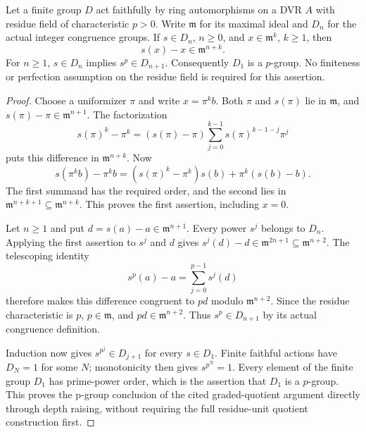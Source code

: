 \begin{lemma}
\label{fw:wild-ramification-p-group}
\leanok
Let a finite group $D$ act faithfully by ring automorphisms on a
DVR $A$ with residue field of characteristic $p>0$. Write
$\mathfrak m$ for its maximal ideal and $D_n$ for the actual
integer congruence groups. If $s\in D_n$, $n\geq0$, and
$x\in\mathfrak m^k$, $k\geq1$, then
\[
 s(x)-x\in\mathfrak m^{n+k}.
\]
For $n\geq1$, $s\in D_n$ implies $s^p\in D_{n+1}$.
Consequently $D_1$ is a $p$-group. No finiteness or perfection
assumption on the residue field is required for this assertion.
\end{lemma}
\begin{proof}
Choose a uniformizer $\pi$ and write $x=\pi^k b$.
Both $\pi$ and $s(\pi)$ lie in $\mathfrak m$, and
$s(\pi)-\pi\in\mathfrak m^{n+1}$. The factorization
\[
 s(\pi)^k-\pi^k=(s(\pi)-\pi)
   \sum_{j=0}^{k-1}s(\pi)^{k-1-j}\pi^j
\]
puts this difference in $\mathfrak m^{n+k}$.
Now
\[
 s(\pi^k b)-\pi^k b=
   (s(\pi)^k-\pi^k)s(b)+\pi^k(s(b)-b).
\]
The first summand has the required order, and the second lies
in $\mathfrak m^{n+k+1}\subseteq\mathfrak m^{n+k}$.
This proves the first assertion, including $x=0$.

Let $n\geq1$ and put $d=s(a)-a\in\mathfrak m^{n+1}$.
Every power $s^j$ belongs to $D_n$. Applying the first assertion
to $s^j$ and $d$ gives
$s^j(d)-d\in\mathfrak m^{2n+1}\subseteq\mathfrak m^{n+2}$.
The telescoping identity
\[
 s^p(a)-a=\sum_{j=0}^{p-1}s^j(d)
\]
therefore makes this difference congruent to $pd$ modulo
$\mathfrak m^{n+2}$. Since the residue characteristic is $p$,
$p\in\mathfrak m$, and $pd\in\mathfrak m^{n+2}$.
Thus $s^p\in D_{n+1}$ by its actual congruence definition.

Induction now gives $s^{p^j}\in D_{j+1}$ for every $s\in D_1$.
Finite faithful actions have $D_N=1$ for some $N$; monotonicity
then gives $s^{p^N}=1$. Every element of the finite group $D_1$
has prime-power order, which is the assertion that $D_1$ is a
$p$-group. This proves the p-group conclusion of the cited
graded-quotient argument directly through depth raising, without
requiring the full residue-unit quotient construction first.
\end{proof}

